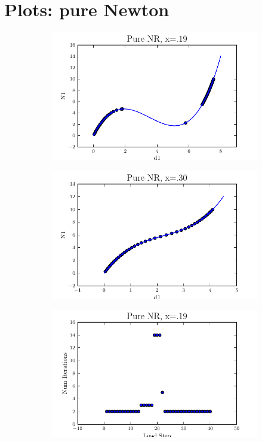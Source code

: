 \documentclass[10pt,letterpaper]{article}
\begin{document}
\section{Plots: pure Newton}
\begin{figure}[!tbh]
  \begin{subfigure}[b]{.6\textwidth}
    \includegraphics[width=1\textwidth]{pure_nr_x19.pdf}
    \caption{}
    \label{fig2:label:a}
  \end{subfigure}
  \hfill
  \begin{subfigure}[b]{.6\textwidth}
    \includegraphics[width=1\textwidth]{pure_nr_x30.pdf}
    \caption{}
    \label{fig2:label:b}
  \end{subfigure}
  \hfill
    \begin{subfigure}[b]{.6\textwidth}
    \includegraphics[width=1\textwidth]{pure_nr_x19_conv.pdf}

\end{subfigure}
\end{figure}
\end{document}
